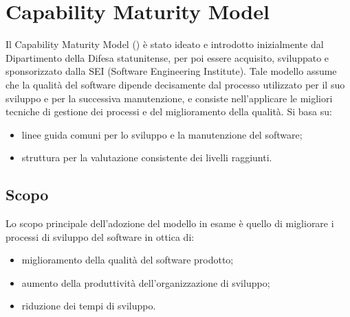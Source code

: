 \documentclass[PianoDiQualifica.tex]{subfiles}
\begin{document}
\hypertarget{CMM_label}{\section{Capability Maturity Model}}
	Il Capability Maturity Model () è stato ideato e introdotto inizialmente dal Dipartimento della Difesa statunitense, per poi essere acquisito, sviluppato e sponsorizzato dalla SEI (Software Engineering Institute). Tale modello
assume che la qualità del software dipende decisamente dal processo utilizzato per il suo sviluppo e per la successiva manutenzione, e consiste nell'applicare le migliori tecniche di gestione dei processi e del miglioramento della qualità. Si basa su:
	\begin{itemize}
		\item linee guida comuni per lo sviluppo e la manutenzione del software;
		\item struttura per la valutazione consistente dei livelli raggiunti.
	\end{itemize}
	
	\subsection{Scopo}
	Lo scopo principale dell'adozione del modello in esame è quello di migliorare i processi di sviluppo del software in ottica di:
	\begin{itemize}
		\item miglioramento della qualità del software prodotto;
		\item aumento della produttività dell'organizzazione di sviluppo;
		\item riduzione dei tempi di sviluppo.
	\end{itemize}
\end{document}
